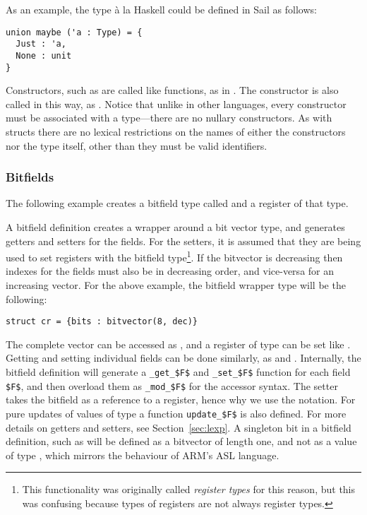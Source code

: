 As an example, the  type \`{a} la Haskell could be defined
in Sail as follows:
\begin{lstlisting}
union maybe ('a : Type) = {
  Just : 'a,
  None : unit
}
\end{lstlisting}
Constructors, such as  are called like functions, as in
. The  constructor is also called in
this way, as . Notice that unlike in other languages, every
constructor must be associated with a type---there are no nullary
constructors. As with structs there are no lexical restrictions on the
names of either the constructors nor the type itself, other than they
must be valid identifiers.

\subsubsection{Bitfields}
\label{sec:bitfield}

The following example creates a bitfield type called  and a
register  of that type.



A bitfield definition creates a wrapper around a bit vector type, and
generates getters and setters for the fields. For the setters, it is
assumed that they are being used to set registers with the bitfield
type\footnote{This functionality was originally called \emph{register
    types} for this reason, but this was confusing because types of
  registers are not always register types.}. If the bitvector is
decreasing then indexes for the fields must also be in decreasing
order, and vice-versa for an increasing vector. For the above example,
the bitfield wrapper type will be the following:

\begin{lstlisting}
struct cr = {bits : bitvector(8, dec)}
\end{lstlisting}

The complete vector can be accessed as , and a register
of type  can be set like . Getting and
setting individual fields can be done similarly, as  and
. Internally, the bitfield definition will
generate a \lstinline[mathescape]{_get_$F$} and
\lstinline[mathescape]{_set_$F$} function for each field
\lstinline[mathescape]{$F$}, and then overload them as
\lstinline[mathescape]{_mod_$F$} for the accessor syntax. The setter
takes the bitfield as a reference to a register, hence why we use the
\ll{->} notation. For pure updates of values of type  a
function \lstinline[mathescape]{update_$F$} is also defined. For more
details on getters and setters, see Section~\ref{sec:lexp}. A
singleton bit in a bitfield definition, such as  will be
defined as a bitvector of length one, and not as a value of type
, which mirrors the behaviour of ARM's ASL language.

